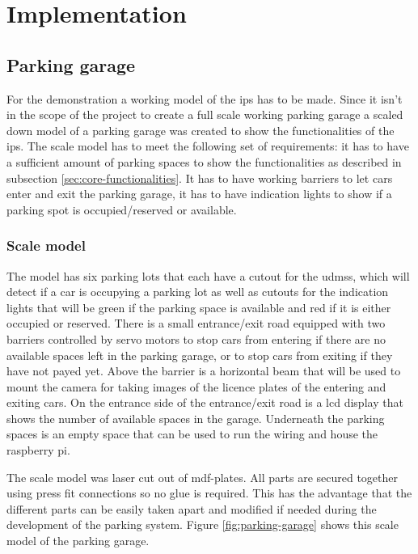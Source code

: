 \section{Implementation}\label{sec:implementation}
\subsection{Parking garage}\label{sec:implementation-parking-garage}
For the demonstration a working model of the \ac{ips} has to be made. Since it isn't in the scope of the project to create a full scale working parking garage a scaled down model of a parking garage was created to show the functionalities of the \ac{ips}. The scale model has to meet the following set of requirements: it has to have a sufficient amount of parking spaces to show the functionalities as described in subsection \ref{sec:core-functionalities}. It has to have working barriers to let cars enter and exit the parking garage, it has to have indication lights to show if a parking spot is occupied/reserved or available.

\subsubsection{Scale model}
The model has six parking lots that each have a cutout for the \acp{udms}, which will detect if a car is occupying a parking lot as well as cutouts for the indication lights that will be green if the parking space is available and red if it is either occupied or reserved. There is a small entrance/exit road equipped with two barriers controlled by servo motors to stop cars from entering if there are no available spaces left in the parking garage, or to stop cars from exiting if they have not payed yet. Above the barrier is a horizontal beam that will be used to mount the camera for taking images of the licence plates of the entering and exiting cars. On the entrance side of the entrance/exit road is a \ac{lcd} display that shows the number of available spaces in the garage. Underneath the parking spaces is an empty space that can be used to run the wiring and house the raspberry pi.

The scale model was laser cut out of \ac{mdf}-plates. All parts are secured together using press fit connections so no glue is required. This has the advantage that the different parts can be easily taken apart and modified if needed during the development of the parking system. Figure \ref{fig:parking-garage} shows this scale model of the parking garage.

